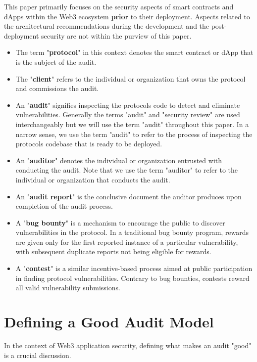 \documentclass[10pt]{extarticle}
\def\tightlist{}
\begin{document}
This paper primarily focuses on the security aspects of smart contracts
and dApps within the Web3 ecosystem \textbf{prior} to their deployment.
Aspects related to the architectural recommendations during the
development and the post-deployment security are not within the purview
of this paper.

\begin{itemize}
\tightlist
\item
  The term "\textbf{protocol}" in this context denotes the smart
  contract or dApp that is the subject of the audit.
\item
  The "\textbf{client}" refers to the individual or organization that
  owns the protocol and commissions the audit.
\item
  An "\textbf{audit}" signifies inspecting the
  protocol\textquotesingle s code to detect and eliminate
  vulnerabilities. Generally the terms "audit" and "security review" are
  used interchangeably but we will use the term "audit" throughout this
  paper. In a narrow sense, we use the term "audit" to refer to the
  process of inspecting the protocol\textquotesingle s codebase that is
  ready to be deployed.
\item
  An "\textbf{auditor}" denotes the individual or organization entrusted
  with conducting the audit. Note that we use the term "auditor" to
  refer to the individual or organization that conducts the audit.
\item
  An "\textbf{audit report}" is the conclusive document the auditor
  produces upon completion of the audit process.
\item
  A "\textbf{bug bounty}" is a mechanism to encourage the public to
  discover vulnerabilities in the protocol. In a traditional bug bounty
  program, rewards are given only for the first reported instance of a
  particular vulnerability, with subsequent duplicate reports not being
  eligible for rewards.
\item
  A "\textbf{contest}" is a similar incentive-based process aimed at
  public participation in finding protocol vulnerabilities. Contrary to
  bug bounties, contests reward all valid vulnerability submissions.
\end{itemize}

\section{Defining a Good Audit
Model}\label{2-defining-a-good-audit-model}

In the context of Web3 application security, defining what makes an
audit "good" is a crucial discussion.
\end{document}
